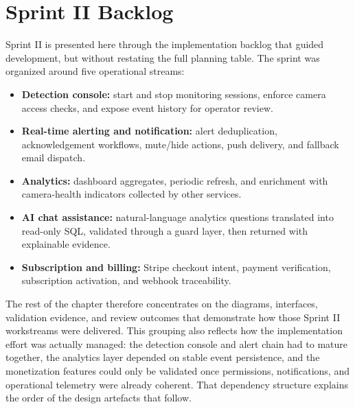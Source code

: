 \documentclass[12pt,a4paper,oneside]{report}
\begin{document}
\section{Sprint II Backlog}
\label{sec:s2_backlog}

\hspace{0.8cm}Sprint II is presented here through the implementation backlog that guided development, but without restating the full planning table. The sprint was organized around five operational streams:

\begin{itemize}[leftmargin=1.2cm]
  \item \textbf{Detection console:} start and stop monitoring sessions, enforce camera access checks, and expose event history for operator review.
  \item \textbf{Real-time alerting and notification:} alert deduplication, acknowledgement workflows, mute/hide actions, push delivery, and fallback email dispatch.
  \item \textbf{Analytics:} dashboard aggregates, periodic refresh, and enrichment with camera-health indicators collected by other services.
  \item \textbf{AI chat assistance:} natural-language analytics questions translated into read-only SQL, validated through a guard layer, then returned with explainable evidence.
  \item \textbf{Subscription and billing:} Stripe checkout intent, payment verification, subscription activation, and webhook traceability.
\end{itemize}

\hspace{0.8cm}The rest of the chapter therefore concentrates on the diagrams, interfaces, validation evidence, and review outcomes that demonstrate how those Sprint II workstreams were delivered.
\hspace{0.8cm}This grouping also reflects how the implementation effort was actually managed: the detection console and alert chain had to mature together, the analytics layer depended on stable event persistence, and the monetization features could only be validated once permissions, notifications, and operational telemetry were already coherent. That dependency structure explains the order of the design artefacts that follow.

\end{document}
